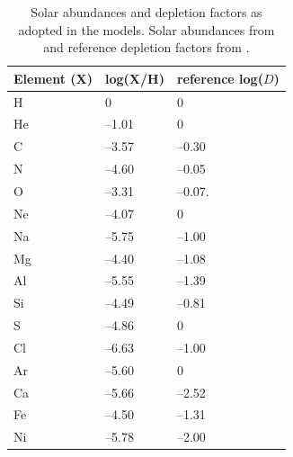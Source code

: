 \documentclass[fleqn,usenatbib]{mnras}
\begin{document}
\begin{table}
 \centering
 \caption{Solar abundances and depletion factors as adopted in the models. Solar abundances from \protect \cite{grevesse2010} and reference depletion factors from \protect \cite{dopita2013}.}
 \begin{tabularx}{\columnwidth}{p{} p{} p{} }
\hline
\hline 
\textbf{Element (X)} & \textbf{log(X/H)} & \textbf{reference log($D$)}             \\ \hline
H                    & 0                 & 0                                       \\
He                   & --1.01            & 0                                       \\
C                    & --3.57            & --0.30                                  \\
N                    & --4.60            & --0.05                                  \\
O                    & --3.31            & --0.07.                                 \\
Ne                   & --4.07            & 0                                       \\
Na                   & --5.75            & --1.00                                  \\
Mg                   & --4.40            & --1.08                                  \\
Al                   & --5.55            & --1.39                                  \\
Si                   & --4.49            & --0.81                                  \\
S                    & --4.86            & 0                                       \\
Cl                   & --6.63            & --1.00                                  \\
Ar                   & --5.60            & 0                                       \\
Ca                   & --5.66            & --2.52                                  \\
Fe                   & --4.50            & --1.31                                  \\
Ni                   & --5.78            & --2.00                                  \\ \hline
\end{tabularx}
\label{tab:metallicities_depletions}
\end{table}
\end{document}
